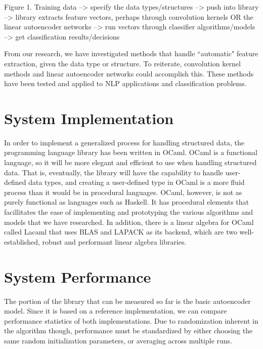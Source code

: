 \documentclass{sig-alternate}
\begin{document}

Figure 1. 
Training data --> specify the data types/structures --> push into library --> library extracts feature vectors, perhaps through convolution kernels OR the linear autoencoder networks -->
run vectors through classifier algorithms/models --> get classification results/decisions


From our research, we have investigated methods that handle ``automatic" feature extraction, given
the data type or structure. To reiterate, convolution kernel methods and linear autoencoder networks 
could accomplish this. These methods have been tested and applied to NLP applications and 
classification problems.

\section{System Implementation}
\label{sec:sysimp}

In order to implement a generalized process for handling structured data, the programming language 
library has been written in OCaml. OCaml is a functional language, so it will be more elegant and 
efficient to use when handling structured data. That is, eventually, the library will have the 
capability to handle user-defined data types, and creating a user-defined type in OCaml is a more
fluid process than it would be in procedural languages. OCaml, however, is not as purely functional 
as languages such as Haskell. It has procedural elements that facillitates the ease of implementing and prototyping the various algorithms and models that we have researched. In addition, there is a 
linear algebra for OCaml called Lacaml that uses BLAS and LAPACK as its backend, which are two
well-established, robust and performant linear algebra libraries.


\section{System Performance}
\label{sec:sysperformance}

The portion of the library that can be measured so far is the basic autoencoder model. 
Since it is based on a reference implementation, we can compare performance statistics of both
implementations. Due to randomization inherent in the algorithm though, performance must be
standardized by either choosing the same random initialization parameters, or averaging 
across multiple runs. 
\end{document}
